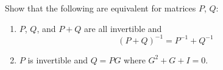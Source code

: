 \begin{multicols}{2}
\begin{supex}
\end{supex}

\begin{supex}
Show that the following are equivalent for matrices $P$, $Q$:


\begin{enumerate}
\item $P$, $Q$, and $P + Q$ are all invertible and 
\begin{equation*}
(P + Q)^{-1} = P^{-1} + Q^{-1}
\end{equation*}

\item $P$ is invertible and $Q = PG$ where $G^{2} + G + I = 0$.

\end{enumerate}
\end{supex}

\end{multicols}
